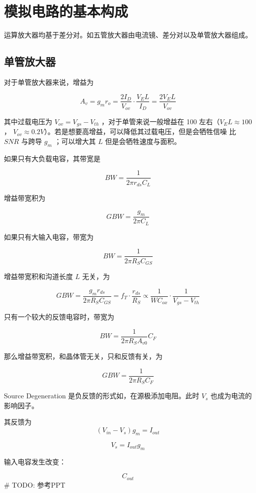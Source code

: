 \documentclass[cn,11pt,chinese,black,simple]{../elegantbook}
\begin{document}
\fi 
\def\chapname{02iccomp}

\chapter{模拟电路的基本构成}

运算放大器均基于差分对。如五管放大器由电流镜、差分对以及单管放大器组成。


\section{单管放大器}

对于单管放大器来说，增益为 


\[A_v = g_m r_o = \frac{2 I_D}{V_{ov}} \cdot \frac{V_E L}{I_D} = \frac{2 V_E L }{V_{ov}}\]

其中过载电压为 \(V_{ov} = V_{gs} - V_{th}\) ，对于单管来说一般增益在 100 左右（\(V_{E} L \approx 100\) ， \(V_{ov} \approx 0.2 V\)）。若是想要高增益，可以降低其过载电压，但是会牺牲信噪 比 \(SNR\) 与跨导 \(g_m\) ；可以增大其 \(L\) 但是会牺牲速度与面积。

如果只有大负载电容，其带宽是 

\[BW = \frac{1}{2 \pi r_{ds} C_L}\]

增益带宽积为 

\[GBW = \frac{g_m}{2 \pi C_L}\]

如果只有大输入电容，带宽为

\[BW = \frac{1}{2 \pi R_S C_{GS}}\]

增益带宽积和沟道长度 \(L\) 无关，为

\[GBW = \frac{g_m r_{ds}}{2 \pi R_S C_{GS}} = f_T \cdot \frac{r_{ds}}{R_S} \propto \frac{1}{W C_{{ox}}} \cdot \frac{1}{V_{gs} - V_{th}}\]

只有一个较大的反馈电容时，带宽为

\[BW = \frac{1}{2 \pi R_S A_{v0}} C_F\]

那么增益带宽积，和晶体管无关，只和反馈有关，为

\[GBW = \frac{1}{2 \pi R_S C_F}\]

Source Degeneration 是负反馈的形式如\figref{\chapname 1}，在源极添加电阻。此时 \(V_s\) 也成为电流的影响因子。


其反馈为 \[(V_{in} - V_s) g_m = I_{out}\] 

\[V_s = I_{out} g_m\]

输入电容发生改变：

\[C_{out}\] # TODO: 参考PPT
\end{document}
